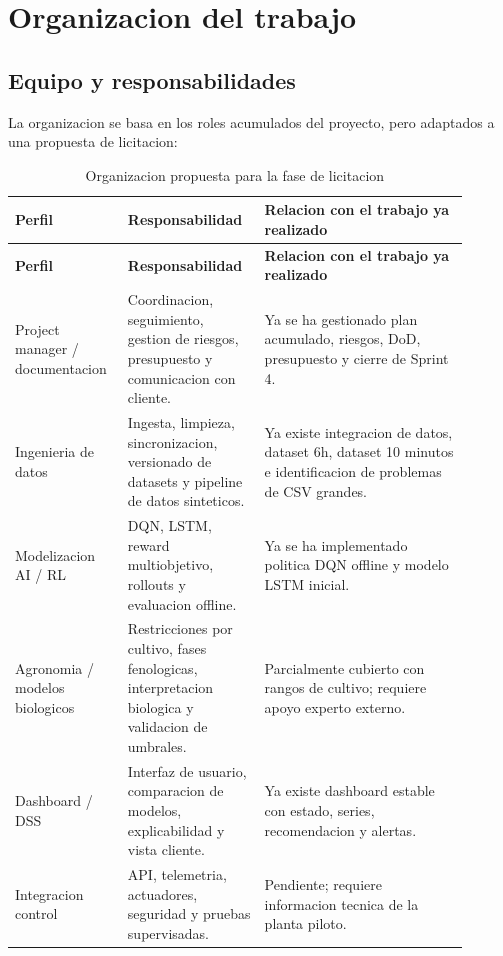 ﻿\documentclass[11pt,a4paper]{article}
\begin{document}
\newpage

\section{Organizacion del trabajo}

\subsection{Equipo y responsabilidades}

La organizacion se basa en los roles acumulados del proyecto, pero adaptados a una propuesta de licitacion:

\begin{longtable}{p{0.22\linewidth}p{0.26\linewidth}p{0.42\linewidth}}
\caption{Organizacion propuesta para la fase de licitacion}\\
\toprule
\textbf{Perfil} & \textbf{Responsabilidad} & \textbf{Relacion con el trabajo ya realizado} \\
\midrule
\endfirsthead
\toprule
\textbf{Perfil} & \textbf{Responsabilidad} & \textbf{Relacion con el trabajo ya realizado} \\
\midrule
\endhead
Project manager / documentacion & Coordinacion, seguimiento, gestion de riesgos, presupuesto y comunicacion con cliente. & Ya se ha gestionado plan acumulado, riesgos, DoD, presupuesto y cierre de Sprint 4. \\ \addlinespace
Ingenieria de datos & Ingesta, limpieza, sincronizacion, versionado de datasets y pipeline de datos sinteticos. & Ya existe integracion de datos, dataset 6h, dataset 10 minutos e identificacion de problemas de CSV grandes. \\ \addlinespace
Modelizacion AI / RL & DQN, LSTM, reward multiobjetivo, rollouts y evaluacion offline. & Ya se ha implementado politica DQN offline y modelo LSTM inicial. \\ \addlinespace
Agronomia / modelos biologicos & Restricciones por cultivo, fases fenologicas, interpretacion biologica y validacion de umbrales. & Parcialmente cubierto con rangos de cultivo; requiere apoyo experto externo. \\ \addlinespace
Dashboard / DSS & Interfaz de usuario, comparacion de modelos, explicabilidad y vista cliente. & Ya existe dashboard estable con estado, series, recomendacion y alertas. \\ \addlinespace
Integracion control & API, telemetria, actuadores, seguridad y pruebas supervisadas. & Pendiente; requiere informacion tecnica de la planta piloto. \\
\bottomrule
\end{longtable}
\end{document}
